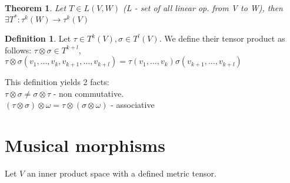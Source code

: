 \documentclass[a4paper, 11pt]{article}
\newtheorem{theorem}{Theorem}
\theoremstyle{definition}
\newtheorem{definition}{Definition}[section]
\begin{document}
\begin{theorem}
	Let $T \in L(V, W)$ (L - set of all linear op. from V to W), then
	$\exists T^*: \tau^k(W) \rightarrow \tau^k(V)$
\end{theorem}

\begin{definition}
	Let $\tau \in T^k(V), \sigma \in T^l(V)$. We define their tensor product as follows:
	$\tau \otimes \sigma \in T^{k+l}$,  \\
	$\tau \otimes \sigma(v_1, \dots, v_k, v_{k+1}, \dots, v_{k+l}) = \tau(v_1, \dots, v_k)\sigma(v_{k+1}, \dots, v_{k+l})$
\end{definition}

This definition yields 2 facts: \\
$\tau \otimes \sigma \neq \sigma \otimes \tau$ - non commutative. \\
$(\tau \otimes \sigma) \otimes \omega = \tau \otimes (\sigma \otimes \omega)$ - associative

\section{Musical morphisms}
Let $V$ an inner product space with a defined metric tensor.

%
\end{document}
